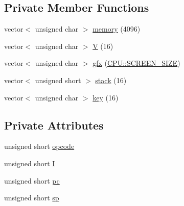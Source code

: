 \subsection*{Private Member Functions}
\begin{DoxyCompactItemize}
\item 
vector$<$ unsigned char $>$ \hyperlink{classCPU_a1b598dddd7c25bc0b575c01cfb437ebe}{memory} (4096)
\item 
vector$<$ unsigned char $>$ \hyperlink{classCPU_a7b3da83191c883e3943f0b53de798152}{V} (16)
\item 
vector$<$ unsigned char $>$ \hyperlink{classCPU_a9fa931e3870a48ba7f222ae8bd00f346}{gfx} (\hyperlink{classCPU_a06c3d3ec8c47f48c437256e8910840a1}{C\-P\-U\-::\-S\-C\-R\-E\-E\-N\-\_\-\-S\-I\-Z\-E})
\item 
vector$<$ unsigned short $>$ \hyperlink{classCPU_a63adc5eba2d9820e0e88d2dfbcdcf1f9}{stack} (16)
\item 
vector$<$ unsigned char $>$ \hyperlink{classCPU_a6b448d2908dbafbcc40563698d26cb4c}{key} (16)
\end{DoxyCompactItemize}
\subsection*{Private Attributes}
\begin{DoxyCompactItemize}
\item 
unsigned short \hyperlink{classCPU_a494cb1c2ba6ce16e3a900eaf7b1a5f63}{opcode}
\item 
unsigned short \hyperlink{classCPU_adf1fd15edb984e81a9f7adda264aa77a}{I}
\item 
unsigned short \hyperlink{classCPU_a7ebf891c17b973e7aa4b1c2164dcab53}{pc}
\item 
unsigned short \hyperlink{classCPU_a4d0854788d689d0f4ee604f3001b1732}{sp}
\end{DoxyCompactItemize}


